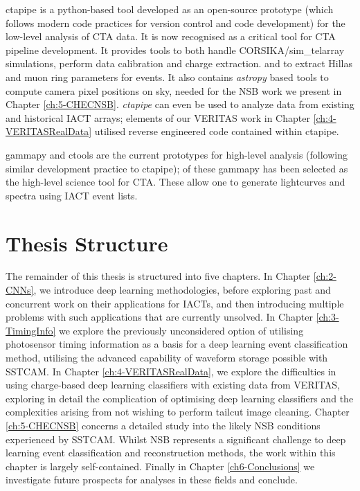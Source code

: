 ctapipe is a python-based tool developed as an open-source prototype (which follows modern code practices for version control and code development) for the low-level analysis of CTA data. It is now recognised as a critical tool for CTA pipeline development. It provides tools to both handle CORSIKA/sim\_telarray simulations, perform data calibration and charge extraction. and to extract Hillas and muon ring parameters for events. It also contains \textit{astropy} based tools to compute camera pixel positions on sky, needed for the NSB work we present in Chapter \ref{ch:5-CHECNSB}. \textit{ctapipe} can even be used to analyze data from existing and historical IACT arrays; elements of our VERITAS work in Chapter \ref{ch:4-VERITASRealData} utilised reverse engineered code contained within ctapipe.

gammapy and ctools are the current prototypes for high-level analysis (following similar development practice to ctapipe); of these gammapy has been selected as the high-level science tool for CTA. These allow one to generate lightcurves and spectra using IACT event lists. 

\section{Thesis Structure}
The remainder of this thesis is structured into five chapters. In Chapter \ref{ch:2-CNNs}, we introduce deep learning methodologies, before exploring past and concurrent work on their applications for IACTs, and then introducing multiple problems with such applications that are currently unsolved. In Chapter \ref{ch:3-TimingInfo} we explore the previously unconsidered option of utilising photosensor timing information as a basis for a deep learning event classification method, utilising the advanced capability of waveform storage possible with SSTCAM. In Chapter \ref{ch:4-VERITASRealData}, we explore the difficulties in using charge-based deep learning classifiers with existing data from VERITAS, exploring in detail the complication of optimising deep learning classifiers and the complexities arising from not wishing to perform tailcut image cleaning. Chapter \ref{ch:5-CHECNSB} concerns a detailed study into the likely NSB conditions experienced by SSTCAM. Whilst NSB represents a significant challenge to deep learning event classification and reconstruction methods, the work within this chapter is largely self-contained. Finally in Chapter \ref{ch6-Conclusions} we investigate future prospects for analyses in these fields and conclude.